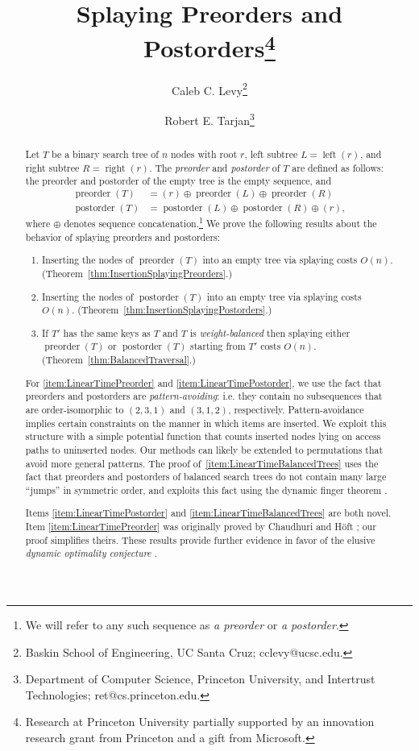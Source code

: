 \documentclass{article}
\title{Splaying Preorders and Postorders\footnote{Research at
Princeton University partially supported by an innovation research grant from
Princeton and a gift from Microsoft.}}
\author{
  Caleb C. Levy\footnote{Baskin School of Engineering, UC Santa Cruz; cclevy@ucsc.edu.}\\
  \and
  Robert E. Tarjan\footnote{Department of Computer Science, Princeton University, and Intertrust Technologies; ret@cs.princeton.edu.}
}
\theoremstyle{plain}
\theoremstyle{definition}
\DeclareMathOperator{\Left}{left}
\DeclareMathOperator{\Right}{right}
\DeclareMathOperator{\Postorder}{postorder}
\DeclareMathOperator{\Preorder}{preorder}
\begin{document}
%
%
\maketitle              %
%
\begin{abstract}
%
Let $T$ be a binary search tree of $n$ nodes with root $r$, left subtree
$L=\Left(r)$, and right subtree $R=\Right(r)$. The \emph{preorder} and
\emph{postorder} of $T$ are defined as follows: the preorder and postorder of
the empty tree is the empty sequence, and
\begin{align*}
\Preorder(T) &= (r)\oplus\Preorder(L)\oplus\Preorder(R)\\
\Postorder(T) &= \Postorder(L)\oplus\Postorder(R)\oplus(r),
\end{align*}
where $\oplus$ denotes sequence concatenation.\footnote{We will refer to any
such sequence as \emph{a preorder} or \emph{a postorder}.} We prove the
following results about the behavior of splaying \cite{SPLAY_JOURNAL} preorders
and postorders:

%
\begin{enumerate}
%
\item\label{item:LinearTimePreorder} Inserting the nodes of $\Preorder(T)$ into
an empty tree via splaying costs $O(n)$.
(Theorem~\ref{thm:InsertionSplayingPreorders}.)
%
\item\label{item:LinearTimePostorder} Inserting the nodes of $\Postorder(T)$
into an empty tree via splaying costs $O(n)$.
(Theorem~\ref{thm:InsertionSplayingPostorders}.)
%
\item\label{item:LinearTimeBalancedTrees} If $T'$ has the same keys as $T$ and
$T$ is \emph{weight-balanced} \cite{WEIGHT_BALANCED_TREES} then
splaying either $\Preorder(T)$ or $\Postorder(T)$ starting from $T'$ costs
$O(n)$. (Theorem~\ref{thm:BalancedTraversal}.)
\end{enumerate}

%
For \ref{item:LinearTimePreorder} and \ref{item:LinearTimePostorder}, we use
the fact that preorders and postorders are \emph{pattern-avoiding}: i.e. they
contain no subsequences that are order-isomorphic to $(2,3,1)$ and $(3,1,2)$,
respectively. Pattern-avoidance implies certain constraints on the manner in
which items are inserted. We exploit this structure with a simple potential
function that counts inserted nodes lying on access paths to uninserted nodes.
Our methods can likely be extended to permutations that avoid more general
patterns. The proof of~\ref{item:LinearTimeBalancedTrees} uses the fact that
preorders and postorders of balanced search trees do not contain many large
``jumps'' in symmetric order, and exploits this fact using the dynamic finger
theorem \cite{DYNAMIC_FINGER_1,DYNAMIC_FINGER_2}.

%
Items \ref{item:LinearTimePostorder} and \ref{item:LinearTimeBalancedTrees} are
both novel. Item \ref{item:LinearTimePreorder} was originally proved by
Chaudhuri and H\"oft \cite{SPLAY_PREORDER}; our proof simplifies theirs. These
results provide further evidence in favor of the elusive \emph{dynamic
optimality conjecture} \cite{SPLAY_JOURNAL}.
\end{abstract}
\end{document}
